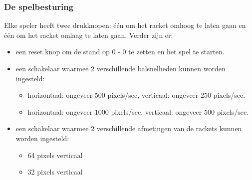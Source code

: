 \subsubsection{De spelbesturing}
Elke speler heeft twee drukknopen:
\'e\'en om het racket omhoog te laten gaan en
\'e\'en om het racket omlaag te laten gaan.
Verder zijn er:
\begin{itemize}
\item
een reset knop om de stand op 0 - 0 te zetten en het spel te starten.
\item
een schakelaar waarmee 2 verschillende balsnelheden kunnen worden ingesteld:
\begin{itemize}
\item
horizontaal: ongeveer 500 pixels/sec, verticaal: ongeveer 250 pixels/sec.
\item
horizontaal: ongeveer 1000 pixels/sec, verticaal: ongeveer 500 pixels/sec.
\end{itemize}
\item
een schakelaar waarmee 2 verschillende afmetingen van de rackets kunnen worden
ingesteld:
\begin{itemize}
\item
64 pixels verticaal
\item
32 pixels verticaal
\end{itemize}
\end{itemize}

